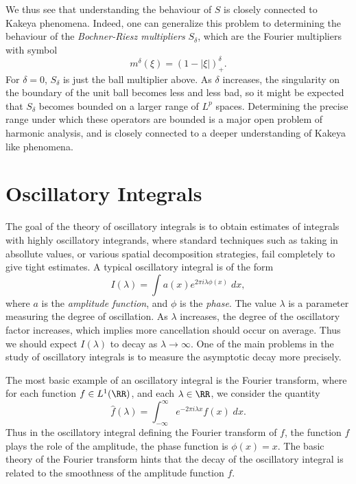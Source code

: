We thus see that understanding the behaviour of $S$ is closely connected to Kakeya phenomena. Indeed, one can generalize this problem to determining the behaviour of the \emph{Bochner-Riesz multipliers} $S_\delta$, which are the Fourier multipliers with symbol
%
\[ m^\delta(\xi) = (1 - |\xi|)_+^\delta. \]
%
For $\delta = 0$, $S_\delta$ is just the ball multiplier above. As $\delta$ increases, the singularity on the boundary of the unit ball becomes less and less bad, so it might be expected that $S_\delta$ becomes bounded on a larger range of $L^p$ spaces. Determining the precise range under which these operators are bounded is a major open problem of harmonic analysis, and is closely connected to a deeper understanding of Kakeya like phenomena.








\chapter{Oscillatory Integrals}

The goal of the theory of oscillatory integrals is to obtain estimates of integrals with highly oscillatory integrands, where standard techniques such as taking in absollute values, or various spatial decomposition strategies, fail completely to give tight estimates. A typical oscillatory integral is of the form
%
\[ I(\lambda) = \int a(x) e^{2 \pi i \lambda \phi(x)}\; dx, \]
%
where $a$ is the \emph{amplitude function}, and $\phi$ is the \emph{phase}. The value $\lambda$ is a parameter measuring the degree of oscillation. As $\lambda$ increases, the degree of the oscillatory factor increases, which implies more cancellation should occur on average. Thus we should expect $I(\lambda)$ to decay as $\lambda \to \infty$. One of the main problems in the study of oscillatory integrals is to measure the asymptotic decay more precisely.

\begin{example}
    The most basic example of an oscillatory integral is the Fourier transform, where for each function $f \in L^1(\RR)$, and each $\lambda \in \RR$, we consider the quantity
    \[ \widehat{f}(\lambda) = \int_{-\infty}^\infty e^{- 2 \pi i \lambda x} f(x)\; dx. \]
    Thus in the oscillatory integral defining the Fourier transform of $f$, the function $f$ plays the role of the amplitude, the phase function is $\phi(x) = x$. The basic theory of the Fourier transform hints that the decay of the oscillatory integral is related to the smoothness of the amplitude function $f$.
\end{example}

